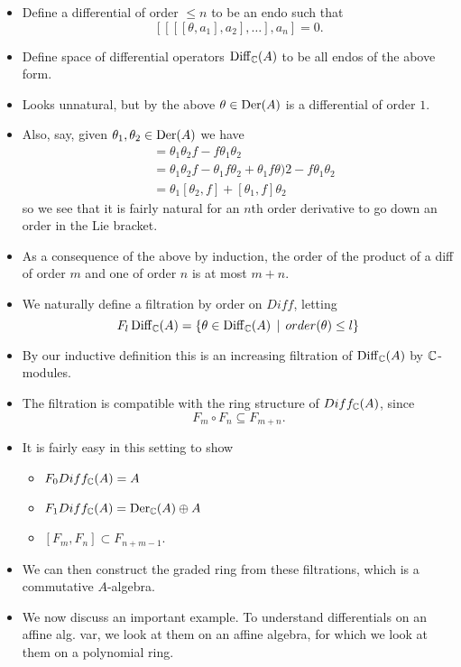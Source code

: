 \documentclass[a4paper]{article}
\def\Diff{\operatorname{Diff}}
\begin{document}
\begin{itemize}
    \item Define a differential of order $\leq n$ to be an endo such that
        \[
            [ [ [ [\theta, a_1], a_2], \dots], a_n] = 0.
        \]
    \item Define space of differential operators $\Diff_\bC(A)$ to be all endos of the above form.
    \item Looks unnatural, but by the above $\theta \in \operatorname{Der}(A)$ is a differential of order $1$.
    \item Also, say, given $\theta_1, \theta_2 \in \operatorname{Der}(A)$ we have
        \begin{align*}
            [\theta_1\theta_2, f] &= \theta_1\theta_2f - f\theta_1\theta_2 \\
                &= \theta_1\theta_2 f - \theta_1 f \theta_2 + \theta_1 f \theta)2 - f\theta_1\theta_2 \\
                &= \theta_1[\theta_2, f] + [\theta_1, f]\theta_2
        \end{align*}
        so we see that it is fairly natural for an $n$th order derivative to go down an order in the Lie bracket.
    \item As a consequence of the above by induction, the order of the product of a diff of order $m$ and one of order $n$ is at most $m+n$.
    \item We naturally define a filtration by order on $Diff$, letting
        \[
            F_l \Diff_\bC(A) = \{\theta \in \Diff_\bC(A) \st order(\theta) \leq l\}
        \]
    \item By our inductive definition this is an increasing filtration of $\Diff_\bC(A)$ by $\mathbb{C}$-modules.
    \item The filtration is compatible with the ring structure of $Diff_{\mathbb{C}}(A)$, since
        \[
            F_m \circ F_n \subseteq F_{m+n}.
        \]
    \item It is fairly easy in this setting to show
        \begin{itemize}
            \item $F_0 Diff_{\mathbb{C}}(A) = A$
            \item $F_1 Diff_{\mathbb{C}}(A) = \operatorname{Der}_{\mathbb{C}}(A) \oplus A$
            \item $[F_m, F_n] \subset F_{n+m-1}$.
        \end{itemize}
    \item We can then construct the graded ring from these filtrations, which is a commutative $A$-algebra.
    \item We now discuss an important example. To understand differentials on an affine alg. var, we look at them on an affine algebra, for which we look at them on a polynomial ring.

\end{itemize}
\end{document}
